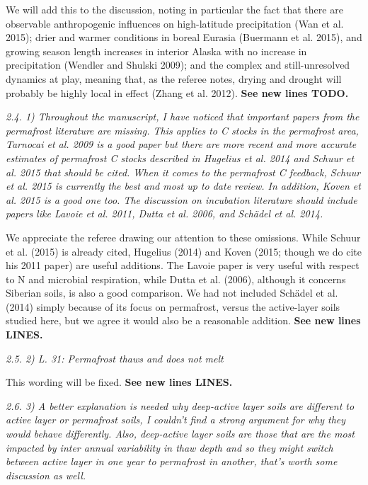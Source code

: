 \documentclass[11pt, oneside]{article}
\begin{document}
We will add this to the discussion, noting in particular the fact that there are observable anthropogenic influences on high-latitude precipitation (Wan et al. 2015); drier and warmer conditions in boreal Eurasia (Buermann et al. 2015), and growing season length increases in interior Alaska with no increase in precipitation (Wendler and Shulski 2009); and the complex and still-unresolved dynamics at play, meaning that, as the referee notes, drying and drought will probably be highly local in effect (Zhang et al. 2012). {\bf See new lines TODO.}

\medskip
{\it 2.4. 1) Throughout the manuscript, I have noticed that important papers from the permafrost literature are missing. This applies to C stocks in the permafrost area, Tarnocai et al. 2009 is a good paper but there are more recent and more accurate estimates of permafrost C stocks described in Hugelius et al. 2014 and Schuur et al. 2015 that should be cited. When it comes to the permafrost C feedback, Schuur et al. 2015 is currently the best and most up to date review. In addition, Koven et al. 2015 is a good one too. The discussion on incubation literature should include papers like Lavoie et al. 2011, Dutta et al. 2006, and Schädel et al. 2014. }

We appreciate the referee drawing our attention to these omissions. While Schuur et al. (2015) is already cited, Hugelius (2014) and Koven (2015; though we do cite his 2011 paper) are useful additions. The Lavoie paper is very useful with respect to N and microbial respiration, while Dutta et al. (2006), although it concerns Siberian soils, is also a good comparison. We had not included Schädel et al. (2014) simply because of its focus on permafrost, versus the active-layer soils studied here, but we agree it would also be a reasonable addition. {\bf See new lines LINES.}

\medskip
{\it 2.5. 2) L. 31: Permafrost thaws and does not melt }

This wording will be fixed. {\bf See new lines LINES.}

\medskip
{\it 2.6. 3) A better explanation is needed why deep-active layer soils are different to active layer or permafrost soils, I couldn't find a strong argument for why they would behave differently. Also, deep-active layer soils are those that are the most impacted by inter annual variability in thaw depth and so they might switch between active layer in one year to permafrost in another, that's worth some discussion as well. }
\end{document}
